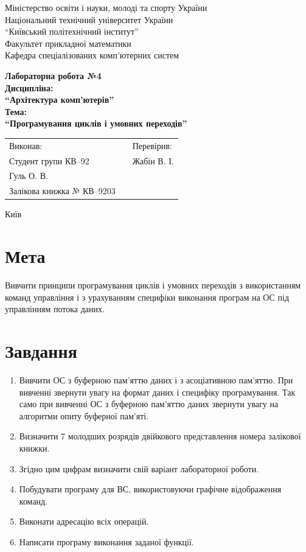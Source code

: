 \documentclass[a4paper, 10pt]{article}
\begin{document}
\begin{titlepage}
\begin{center}
\large{
Міністерство освіти і науки, молоді та спорту України\\
Національний технічний університет України\\
``Київський політехнічний інститут''\\
Факультет прикладної математики\\
Кафедра спеціалізованих комп’ютерних систем\\
}

\vfill

\large{\bf{
Лабораторна робота №4\\
Дисципліна:\\
``Архітектура комп'ютерів''\\
Тема:\\
``Програмування циклів і умовних переходів''\\
}}

\vfill

\begin{table}[h]
\centering
\begin{tabular}{lp{4cm}l}
Виконав:&&Перевірив:\\
Студент групи КВ--92&&Жабін В. І.\\
Гуль О. В.&&\\
Залікова книжка № КВ--9203&&\\
\end{tabular}
\end{table}

\vfill

Київ \the\year
\end{center}
\end{titlepage}
\newpage

\section{Мета}
Вивчити принципи програмування циклів і умовних переходів з використанням команд управління і з урахуванням специфіки виконання програм на ОС під управлінням потока даних.

\section{Завдання}
\begin{enumerate}
    \item Вивчити ОС з буферною пам'яттю даних і з асоціативною пам'яттю. При вивченні звернути увагу на формат даних і специфіку програмування. Так само при вивченні ОС з буферною пам'яттю даних звернути увагу на алгоритми опиту буферної пам'яті.
    \item Визначити 7 молодших розрядів двійкового представлення номера залікової книжки.
    \item Згідно цим цифрам визначити свій варіант лабораторної роботи.
    \item Побудувати програму для ВС, використовуючи графічне відображення команд.
    \item Виконати адресацію всіх операцій.
    \item Написати програму виконання заданої функції.
\end{enumerate}
\end{document}
